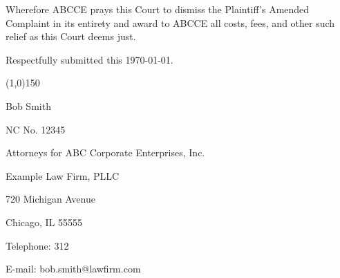 \documentclass[12pt]{article}
\newcommand{\client}{ABC Corporate Enterprises, Inc. }
\newcommand{\csn}{ABCCE }
\begin{document}
Wherefore \csn prays this Court to dismiss the Plaintiff's Amended Complaint in its entirety and award to \csn all costs, fees, and other such relief as this Court deems just.\newpage

Respectfully submitted this \sigdate\today.

\vspace{1cm}

\singlespacing
\hspace{7cm}\line(1,0){150}

\hspace{7cm}Bob Smith

\hspace{7cm}NC No. 12345

\hspace{7cm}Attorneys for \client

\hspace{7cm}Example Law Firm, PLLC

\hspace{7cm}720 Michigan Avenue

\hspace{7cm}Chicago, IL 55555

\hspace{7cm}Telephone: 312

\hspace{7cm}E-mail: bob.smith@lawfirm.com
\end{document}
